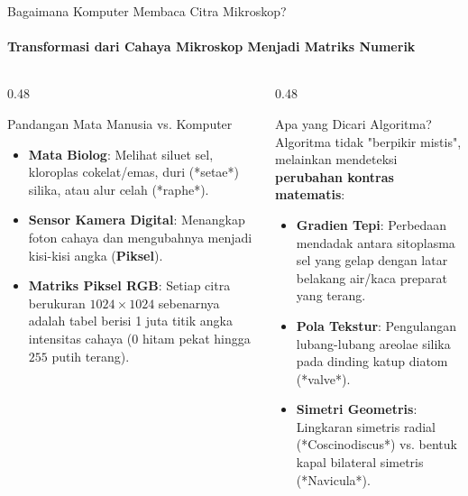 \documentclass[aspectratio=169, 10pt]{beamer}
\begin{document}
\begin{frame}{Bagaimana Komputer Membaca Citra Mikroskop?}
    \framesubtitle{Transformasi dari Cahaya Mikroskop Menjadi Matriks Numerik}
    
    \begin{columns}[T]
        \begin{column}{0.48\textwidth}
            \begin{conceptcard}{Pandangan Mata Manusia vs. Komputer}
                \scriptsize
                \begin{itemize}\setlength\itemsep{4pt}
                    \item \textbf{Mata Biolog}: Melihat siluet sel, kloroplas cokelat/emas, duri (*setae*) silika, atau alur celah (*raphe*).
                    \item \textbf{Sensor Kamera Digital}: Menangkap foton cahaya dan mengubahnya menjadi kisi-kisi angka (\textbf{Piksel}).
                    \item \textbf{Matriks Piksel RGB}: Setiap citra berukuran $1024 \times 1024$ sebenarnya adalah tabel berisi 1 juta titik angka intensitas cahaya ($0$ hitam pekat hingga $255$ putih terang).
                \end{itemize}
            \end{conceptcard}
        \end{column}
        
        \begin{column}{0.48\textwidth}
            \begin{biocard}{Apa yang Dicari Algoritma?}
                \scriptsize
                Algoritma tidak "berpikir mistis", melainkan mendeteksi \textbf{perubahan kontras matematis}:
                \begin{itemize}\setlength\itemsep{3pt}
                    \item \textbf{Gradien Tepi}: Perbedaan mendadak antara sitoplasma sel yang gelap dengan latar belakang air/kaca preparat yang terang.
                    \item \textbf{Pola Tekstur}: Pengulangan lubang-lubang areolae silika pada dinding katup diatom (*valve*).
                    \item \textbf{Simetri Geometris}: Lingkaran simetris radial (*Coscinodiscus*) vs. bentuk kapal bilateral simetris (*Navicula*).
                \end{itemize}
            \end{biocard}
        \end{column}
    \end{columns}
\end{frame}
\end{document}
